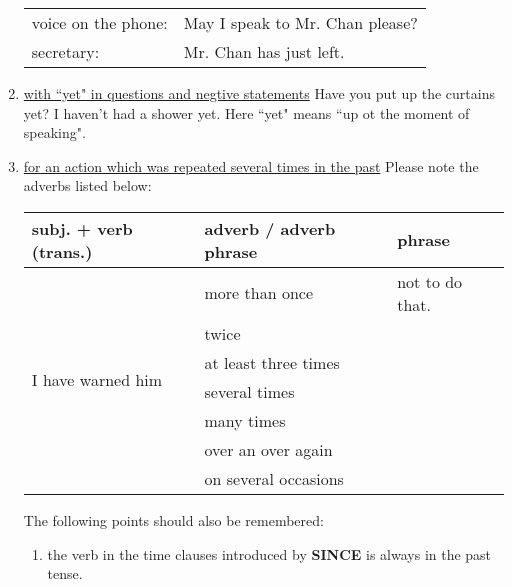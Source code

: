 \begin{enumerate}
        \begin{tabular}{ll}
            voice on the phone: & May I speak to Mr. Chan please? \\
            secretary: & Mr. Chan has just left.
        \end{tabular}
    \item \underline{with ``yet" in questions and negtive statements}
        \newline
        \newline
        Have you put up the curtains yet?
        \newline
        \newline
        I haven't had a shower yet.
        \newline
        \newline
        Here ``yet" means ``up ot the moment of speaking".
    \item \underline{for an action which was repeated several times in the past}
        \newline
        \newline
        Please note the adverbs listed below:
        \newline
        \newline
        \begin{tabular}{|l|l|l|}
            \hline
            subj. + verb (trans.) & adverb / adverb phrase & phrase \\
            \hline
            \multirow{7}{*}{I have warned him}
            & more than once & not to do that. \\
            & twice & \\
            & at least three times & \\
            & several times & \\
            & many times & \\
            & over an over again & \\
            & on several occasions & \\ \hline
        \end{tabular}
        \newline
        \newline
        The following points should also be remembered:
        \begin{enumerate}
            \item the verb in the time clauses introduced by \textbf{SINCE} is
                always in the past tense.
                \newline

\end{enumerate}
\end{enumerate}
